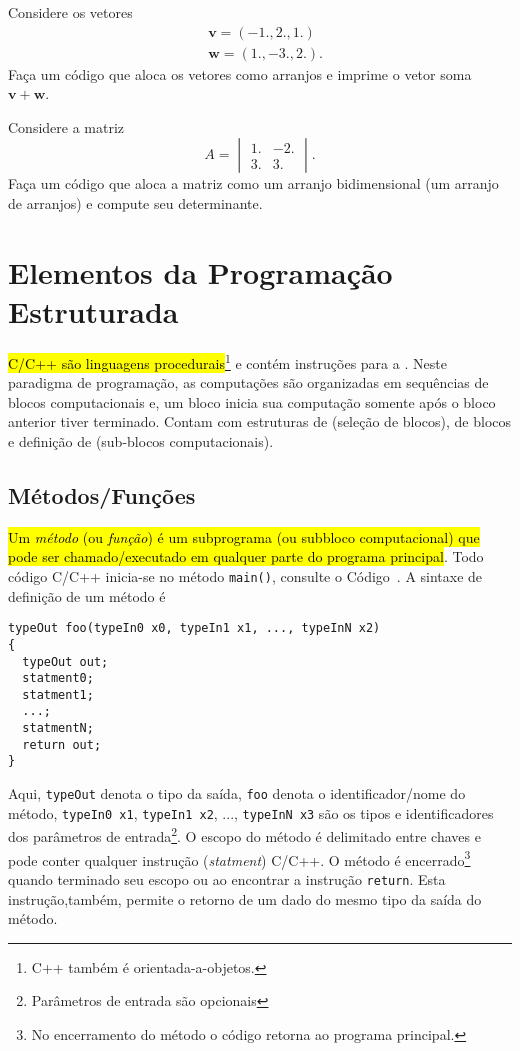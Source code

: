 \documentclass[12pt]{article}
\begin{document}
\begin{exr}
  Considere os vetores
  \begin{align}
    &\pmb{v} = (-1., 2., 1.)\\
    &\pmb{w} = (1., -3., 2.).
  \end{align}
  Faça um código que aloca os vetores como arranjos e imprime o vetor soma $\pmb{v} + \pmb{w}$.
\end{exr}

\begin{exr}
  Considere a matriz
  \begin{equation}
    A =
    \begin{vmatrix}
      1. & -2.\\
      3. & 3.
    \end{vmatrix}.
  \end{equation}
  Faça um código que aloca a matriz como um arranjo bidimensional (um arranjo de arranjos) e compute seu determinante.
\end{exr}

\section{Elementos da Programação Estruturada}\label{sec_progest}

\hl{C/C++ são linguagens procedurais}\footnote{C++ também é orientada-a-objetos.} e contém instruções para a . Neste paradigma de programação, as computações são organizadas em sequências de blocos computacionais e, um bloco inicia sua computação somente após o bloco anterior tiver terminado. Contam com estruturas de  (seleção de blocos),  de blocos e definição de  (sub-blocos computacionais).

\subsection{Métodos/Funções}

\hl{Um \emph{método} (ou \emph{função}) é um subprograma (ou subbloco computacional) que pode ser chamado/executado em qualquer parte do programa principal}. Todo código C/C++ inicia-se no método \lstinline+main()+, consulte o Código~\label{cod:ola}. A sintaxe de definição de um método é
\begin{lstlisting}
typeOut foo(typeIn0 x0, typeIn1 x1, ..., typeInN x2)
{
  typeOut out;
  statment0;
  statment1;
  ...;
  statmentN;
  return out;
}
\end{lstlisting}
Aqui, \lstinline+typeOut+ denota o tipo da saída, \lstinline+foo+ denota o identificador/nome do método, \lstinline+typeIn0 x1+, \lstinline+typeIn1 x2+, ..., \lstinline+typeInN x3+ são os tipos e identificadores dos parâmetros de entrada\footnote{Parâmetros de entrada são opcionais}. O escopo do método é delimitado entre chaves e pode conter qualquer instrução (\textit{statment}) C/C++. O método é encerrado\footnote{No encerramento do método o código retorna ao programa principal.} quando terminado seu escopo ou ao encontrar a instrução \lstinline+return+. Esta instrução,também, permite o retorno de um dado do mesmo tipo da saída do método.
\end{document}
